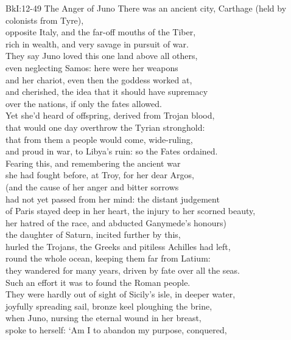 \documentclass[12pt, a5paper]{letter}
\begin{document}
{BkI:12-49 The Anger of Juno}
There was an ancient city, Carthage (held by colonists from Tyre),\\
opposite Italy, and the far-off mouths of the Tiber,\\
rich in wealth, and very savage in pursuit of war.\\
They say Juno loved this one land above all others,\\
even neglecting Samos: here were her weapons\\
and her chariot, even then the goddess worked at,\\
and cherished, the idea that it should have supremacy\\
over the nations, if only the fates allowed.\\
Yet she'd heard of offspring, derived from Trojan blood,\\
that would one day overthrow the Tyrian stronghold:\\
that from them a people would come, wide-ruling,\\
and proud in war, to Libya's ruin: so the Fates ordained.\\
Fearing this, and remembering the ancient war\\
she had fought before, at Troy, for her dear Argos,\\
(and the cause of her anger and bitter sorrows\\
had not yet passed from her mind: the distant judgement\\
of Paris stayed deep in her heart, the injury to her scorned beauty,\\
her hatred of the race, and abducted Ganymede's honours)\\
the daughter of Saturn, incited further by this,\\
hurled the Trojans, the Greeks and pitiless Achilles had left,\\
round the whole ocean, keeping them far from Latium:\\
they wandered for many years, driven by fate over all the seas.\\
Such an effort it was to found the Roman people.\\
They were hardly out of sight of Sicily's isle, in deeper water,\\
joyfully spreading sail, bronze keel ploughing the brine,\\
when Juno, nursing the eternal wound in her breast,\\
spoke to herself: `Am I to abandon my purpose, conquered,\\
\end{document}
